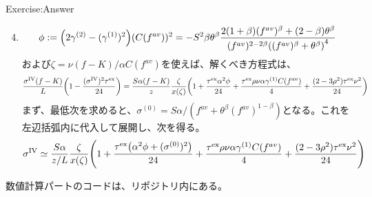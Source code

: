 \documentclass[dvipdfmx,9pt]{beamer}
\begin{document}
\begin{frame}{Exercise:Answer}
  \begin{enumerate}\setcounter{enumi}{3}
    \item
          \begin{equation}
            \phi := \pqty{2\gamma^{(2)} - (\gamma^{(1)})^{2}}(C(f^{av}))^{2}
            = -S^{2}\beta \theta^{\beta}\frac{2(1+\beta)(f^{av})^{\beta} + (2-\beta)\theta^{\beta}}{(f^{av})^{2-2\beta}\pqty{(f^{av})^{\beta} + \theta^{\beta}}^{4}}
          \end{equation}
          および$\zeta = \nu (f-K) / \alpha C(f^{av})$を使えば、解くべき方程式は、
          {\tiny
          \begin{equation}
            \frac{\sigma^{\mathrm{IV}}(f-K)}{L} \pqty{1 - \frac{(\sigma^{\mathrm{IV}})^{2}\tau^{\mathrm{ex}}}{24}} = \frac{S \alpha (f-K)}{z}\frac{\zeta}{x(\zeta)} \pqty{ 1 + \frac{\tau^{\mathrm{ex}}\alpha^{2}\phi}{24} + \frac{\tau^{\mathrm{ex}}\rho\nu\alpha\gamma^{(1)}C(f^{av})}{4} + \frac{(2-3\rho^{2})\tau^{\mathrm{ex}}\nu^{2}}{24}}
          \end{equation}
          }
          まず、最低次を求めると、$\sigma^{(0)} = S\alpha /(f^{av} + \theta^{\beta}(f^{av})^{1-\beta})$となる。これを左辺括弧内に代入して展開し、次を得る。
          \begin{equation}
            \sigma^{\mathrm{IV}} \simeq \frac{S\alpha}{z/L} \frac{\zeta}{x(\zeta)}\pqty{ 1 + \frac{\tau^{\mathrm{ex}}\pqty{\alpha^{2}\phi + (\sigma^{(0)})^{2}}}{24} + \frac{\tau^{\mathrm{ex}}\rho\nu\alpha\gamma^{(1)}C(f^{av})}{4} + \frac{(2-3\rho^{2})\tau^{\mathrm{ex}}\nu^{2}}{24}}
          \end{equation}
  \end{enumerate}
  数値計算パートのコードは、リポジトリ内にある。
\end{frame}
\end{document}

